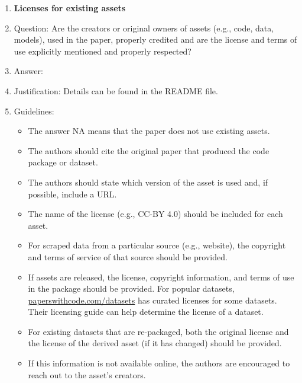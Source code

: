 \documentclass{article}
\theoremstyle{plain}
\theoremstyle{definition}
\begin{document}
\begin{enumerate}
\item {\bf Licenses for existing assets}
    \item[] Question: Are the creators or original owners of assets (e.g., code, data, models), used in the paper, properly credited and are the license and terms of use explicitly mentioned and properly respected?
    \item[] Answer: \answerYes{} 
    \item[] Justification: Details can be found in the README file.
    \item[] Guidelines:
    \begin{itemize}
        \item The answer NA means that the paper does not use existing assets.
        \item The authors should cite the original paper that produced the code package or dataset.
        \item The authors should state which version of the asset is used and, if possible, include a URL.
        \item The name of the license (e.g., CC-BY 4.0) should be included for each asset.
        \item For scraped data from a particular source (e.g., website), the copyright and terms of service of that source should be provided.
        \item If assets are released, the license, copyright information, and terms of use in the package should be provided. For popular datasets, \url{paperswithcode.com/datasets} has curated licenses for some datasets. Their licensing guide can help determine the license of a dataset.
        \item For existing datasets that are re-packaged, both the original license and the license of the derived asset (if it has changed) should be provided.
        \item If this information is not available online, the authors are encouraged to reach out to the asset's creators.
    \end{itemize}


\end{enumerate}
\end{document}
